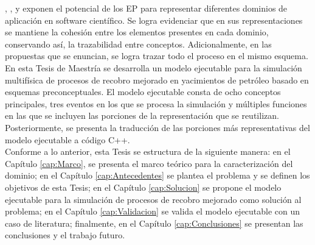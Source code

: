 \cite{norena2018timrep}, \cite{norena2018det}, \cite{norena2018ruido} y \cite{norena2018bs} exponen el potencial de los EP para representar diferentes dominios de aplicación en software científico. Se logra evidenciar que en sus representaciones se mantiene la cohesión entre los elementos presentes en cada dominio, conservando así, la trazabilidad entre conceptos. Adicionalmente, en las propuestas que se enuncian, se logra trazar todo el proceso en el mismo esquema.\\

En esta Tesis de Maestría se desarrolla un modelo ejecutable para la simulación multifísica de procesos de recobro mejorado en yacimientos de petróleo basado en esquemas preconceptuales. El modelo ejecutable consta de ocho conceptos principales, tres eventos en los que se procesa la simulación y múltiples funciones en las que se incluyen las porciones de la representación que se reutilizan. Posteriormente, se presenta la traducción de las porciones más representativas del modelo ejecutable a código C++.\\

Conforme a lo anterior, esta Tesis se estructura de la siguiente manera: en el Capítulo \ref{cap:Marco}, se presenta el marco teórico para la caracterización del dominio; en el Capítulo \ref{cap:Antecedentes} se plantea el problema y se definen los objetivos de esta Tesis; en el Capítulo \ref{cap:Solucion} se propone el modelo ejecutable para la simulación de procesos de recobro mejorado como solución al problema; en el Capítulo \ref{cap:Validacion} se valida el modelo ejecutable con un caso de literatura; finalmente, en el Capítulo \ref{cap:Conclusiones} se presentan las conclusiones y el trabajo futuro.\\





